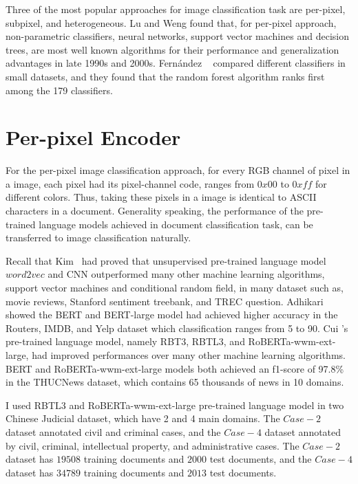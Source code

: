\documentclass[review]{cvpr}
\begin{document}
Three of the most popular approaches for image classification task are per-pixel, subpixel, and heterogeneous.
Lu and Weng found that, for per-pixel approach, non-parametric classifiers, \eg neural networks, support vector machines and decision trees,
are most well known algorithms for their performance and generalization advantages in late 1990s and 2000s.
Fern{\'a}ndez \etal~\cite{fernandez2014we} compared different classifiers in small datasets, and they found that the random forest algorithm ranks first among the 179 classifiers.

\section{Per-pixel Encoder}

For the per-pixel image classification approach, for every RGB channel of pixel in a image,
each pixel had its pixel-channel code, ranges from $0x00$ to $0xff$ for different colors.
Thus, taking these pixels in a image is identical to ASCII characters in a document.
Generality speaking, the performance of the pre-trained language models achieved in document classification task, can be transferred to image classification naturally.

\par Recall that Kim~\cite{kim2014convolutional} had proved that unsupervised pre-trained language model $word2vec$ and CNN outperformed many other machine learning algorithms,
\eg support vector machines and conditional random field, in many dataset such as, movie reviews, Stanford sentiment treebank, and TREC question.
Adhikari \etal~\cite{adhikari2019docbert} showed the BERT and BERT-large model had achieved higher accuracy in the Routers, IMDB, and Yelp dataset which classification ranges from 5 to 90.
Cui \etal's pre-trained language model, namely RBT3, RBTL3, and RoBERTa-wwm-ext-large, had improved performances over many other machine learning algorithms.
BERT and RoBERTa-wwm-ext-large models both achieved an f1-score of 97.8\% in the THUCNews dataset, which contains 65 thousands of news in 10 domains.

\par I used RBTL3 and RoBERTa-wwm-ext-large pre-trained language model in two Chinese Judicial dataset, which have 2 and 4 main domains.
The $Case-2$ dataset annotated civil and criminal cases, and the $Case-4$ dataset annotated by civil, criminal, intellectual property, and administrative cases.
The $Case-2$ dataset has $19508$ training documents and $2000$ test documents, and the $Case-4$ dataset has $34789$ training documents and $2013$ test documents.
\end{document}
